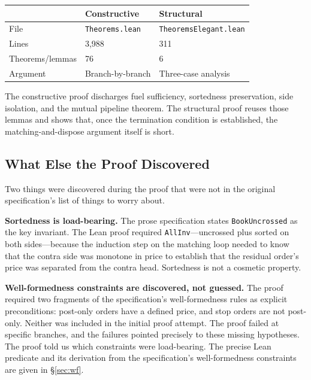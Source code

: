 \documentclass[11pt,a4paper]{article}
\begin{document}
\begin{center}
\small
\begin{tabular}{@{}lll@{}}
\toprule
                        & Constructive              & Structural              \\
\midrule
File                    & \texttt{Theorems.lean}    & \texttt{TheoremsElegant.lean} \\
Lines                   & 3{,}988                   & 311                     \\
Theorems/lemmas         & 76                        & 6                       \\
Argument                & Branch-by-branch          & Three-case analysis     \\
\bottomrule
\end{tabular}
\end{center}

The constructive proof discharges fuel sufficiency, sortedness
preservation, side isolation, and the mutual pipeline theorem. The
structural proof reuses those lemmas and shows that, once the
termination condition is established, the matching-and-dispose argument
itself is short.

\subsection{What Else the Proof Discovered}
\label{sec:lean-discovered}

Two things were discovered during the proof that were not in the original
specification's list of things to worry about.

\textbf{Sortedness is load-bearing.} The prose specification states
\texttt{BookUncrossed} as the key invariant. The Lean proof required
\texttt{AllInv}---uncrossed plus sorted on both sides---because the
induction step on the matching loop needed to know that the contra side
was monotone in price to establish that the residual order's price was
separated from the contra head. Sortedness is not a cosmetic property.

\textbf{Well-formedness constraints are discovered, not guessed.} The
proof required two fragments of the specification's well-formedness
rules as explicit preconditions: post-only orders have a defined price,
and stop orders are not post-only. Neither was included in the initial
proof attempt. The proof failed at specific branches, and the failures
pointed precisely to these missing hypotheses. The proof told us which
constraints were load-bearing. The precise Lean predicate and its
derivation from the specification's well-formedness constraints are
given in \S\ref{sec:wf}.
\end{document}

